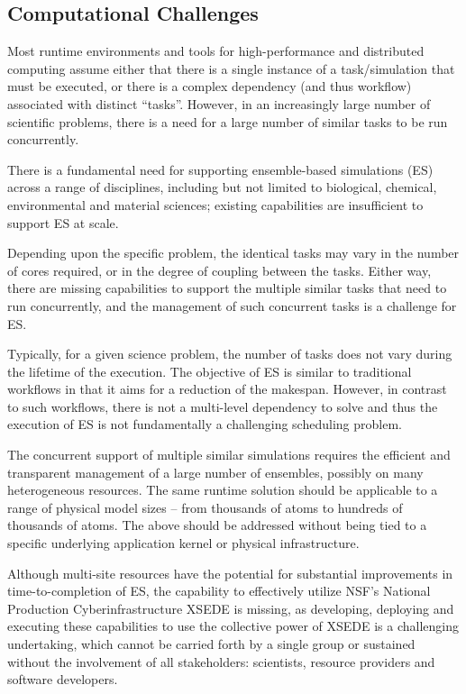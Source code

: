 \documentclass{sig-alternate}
\begin{document}
\subsection{Computational Challenges}

Most runtime environments and tools for high-performance and
distributed computing assume either that there is a single instance of
a task/simulation that must be executed, or there is a complex
dependency (and thus workflow) associated with distinct ``tasks''.
However, in an increasingly large number of scientific problems, there
is a need for a large number of similar tasks to be run concurrently.

There is a fundamental need for supporting ensemble-based simulations
(ES) across a range of disciplines, including but not limited to
biological, chemical, environmental and material sciences; existing
capabilities are insufficient to support ES at scale. 

Depending upon the specific problem, the identical tasks may vary in
the number of cores required, or in the degree of coupling between the
tasks.  Either way, there are missing capabilities to support the
multiple similar tasks that need to run concurrently, and the management
of such concurrent tasks is a challenge for ES. 

Typically, for a given science problem, the number of tasks does not vary during
the lifetime of the execution. The objective of ES is similar to 
traditional workflows in that it aims for a reduction of the makespan.
However, in contrast to such workflows, there is not a multi-level
dependency to solve and thus the execution of ES 
is not fundamentally a challenging scheduling problem.

The concurrent support of multiple similar simulations requires the
efficient and transparent management of a large number of ensembles,
possibly on many heterogeneous resources. The same runtime solution
should be applicable to a range of physical model sizes -- from
thousands of atoms to hundreds of thousands of atoms.
The above should be addressed without being tied to a specific
underlying application kernel or physical infrastructure. 
 
Although multi-site resources have the potential for substantial
improvements in time-to-completion of ES, the capability to
effectively utilize NSF's National Production Cyberinfrastructure
XSEDE is missing, as developing, deploying and executing these
capabilities to use the collective power of XSEDE is a challenging
undertaking, which cannot be carried forth by a single group or
sustained without the involvement of all stakeholders: scientists,
resource providers and software developers.
\end{document}
